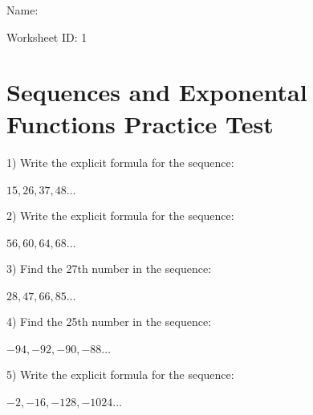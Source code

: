 \documentclass[12pt]{article}
\begin{document}
\begin{flushright}
Name: \underline{\hspace{2.5 in}}
\end{flushright}
\begin{flushright}
Worksheet ID: 1
\end{flushright}
\section*{Sequences and Exponental Functions Practice Test}




1) Write the explicit formula for the sequence: \\ \\
$15, 26, 37, 48 \ldots $ 

\hrulefill



2) Write the explicit formula for the sequence: \\ \\
$56, 60, 64, 68 \ldots $ 

\hrulefill






3) Find the 27th number in the sequence: \\ \\
$28, 47, 66, 85\ldots $ 


\hrulefill




4) Find the 25th number in the sequence: \\ \\
$-94, -92, -90, -88\ldots $ 


\hrulefill





5) Write the explicit formula for the sequence: \\ \\
$-2, -16, -128, -1024\ldots $
\end{document}

